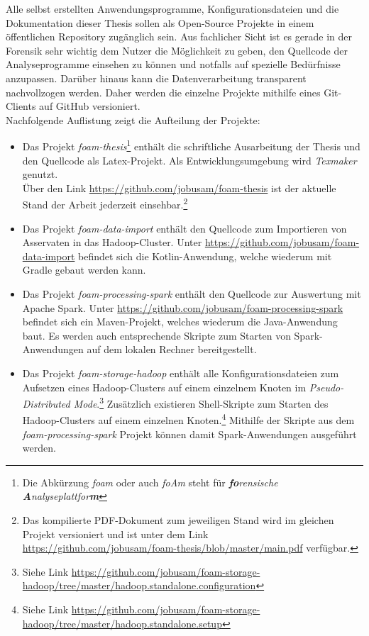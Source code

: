 \noindent
Alle selbst erstellten Anwendungsprogramme, Konfigurationsdateien und die Dokumentation dieser Thesis sollen als Open-Source Projekte in einem öffentlichen Repository zugänglich sein. Aus fachlicher Sicht ist es gerade in der Forensik sehr wichtig dem Nutzer die Möglichkeit zu geben, den Quellcode der Analyseprogramme einsehen zu können und notfalls auf spezielle Bedürfnisse anzupassen. Darüber hinaus kann die Datenverarbeitung transparent nachvollzogen werden.
Daher werden die einzelne Projekte mithilfe eines Git-Clients auf GitHub versioniert.\\
Nachfolgende Auflistung zeigt die Aufteilung der Projekte:
\begin{itemize}
\item Das Projekt \textit{foam-thesis}\footnote{Die Abkürzung \textit{foam} oder auch \textit{foAm} steht für \textit{\textbf{fo}rensische \textbf{A}nalyseplattfor\textbf{m}}} enthält die schriftliche Ausarbeitung der Thesis und den Quellcode als Latex-Projekt. Als Entwicklungsumgebung wird \textit{Texmaker} genutzt.\\
Über den Link \url{https://github.com/jobusam/foam-thesis} ist der aktuelle Stand der Arbeit jederzeit einsehbar.\footnote{Das kompilierte PDF-Dokument zum jeweiligen Stand wird im gleichen Projekt versioniert und ist unter dem Link \url{https://github.com/jobusam/foam-thesis/blob/master/main.pdf} verfügbar.}

\item Das Projekt \textit{foam-data-import} enthält den Quellcode zum Importieren von Asservaten in das Hadoop-Cluster. Unter \url{https://github.com/jobusam/foam-data-import} befindet sich die Kotlin-Anwendung, welche wiederum mit Gradle gebaut werden kann.

\item Das Projekt \textit{foam-processing-spark} enthält den Quellcode zur Auswertung mit Apache Spark\texttrademark\thinspace. Unter \url{https://github.com/jobusam/foam-processing-spark} befindet sich ein Maven-Projekt, welches wiederum die Java-Anwendung baut. Es werden auch entsprechende Skripte zum Starten von Spark-Anwendungen auf dem lokalen Rechner bereitgestellt. 

\item Das Projekt \textit{foam-storage-hadoop} enthält alle Konfigurationsdateien zum Aufsetzen eines Hadoop-Clusters auf einem einzelnem Knoten im \textit{Pseudo-Distributed Mode}.\footnote{Siehe Link \url{https://github.com/jobusam/foam-storage-hadoop/tree/master/hadoop.standalone.configuration}} Zusätzlich existieren Shell-Skripte zum Starten des Hadoop-Clusters auf einem einzelnen Knoten.\footnote{Siehe Link \url{https://github.com/jobusam/foam-storage-hadoop/tree/master/hadoop.standalone.setup}} Mithilfe der Skripte aus dem \textit{foam-processing-spark} Projekt können damit Spark-Anwendungen ausgeführt werden.
\end{itemize}


